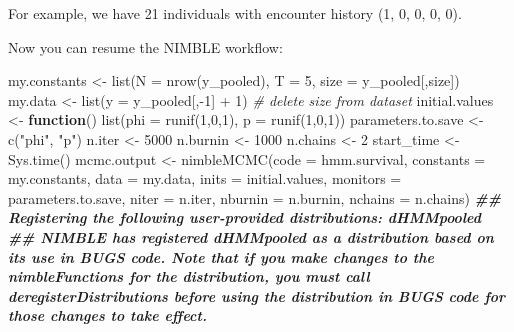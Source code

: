 \documentclass[
  12pt,
]{krantz}
\newenvironment{Shaded}{\begin{snugshade}}{\end{snugshade}}
\newcommand{\AttributeTok}[1]{\textcolor[rgb]{0.77,0.63,0.00}{#1}}
\newcommand{\CommentTok}[1]{\textcolor[rgb]{0.56,0.35,0.01}{\textit{#1}}}
\newcommand{\ControlFlowTok}[1]{\textcolor[rgb]{0.13,0.29,0.53}{\textbf{#1}}}
\newcommand{\DecValTok}[1]{\textcolor[rgb]{0.00,0.00,0.81}{#1}}
\newcommand{\DocumentationTok}[1]{\textcolor[rgb]{0.56,0.35,0.01}{\textbf{\textit{#1}}}}
\newcommand{\FunctionTok}[1]{\textcolor[rgb]{0.00,0.00,0.00}{#1}}
\newcommand{\NormalTok}[1]{#1}
\newcommand{\OtherTok}[1]{\textcolor[rgb]{0.56,0.35,0.01}{#1}}
\newcommand{\SpecialCharTok}[1]{\textcolor[rgb]{0.00,0.00,0.00}{#1}}
\newcommand{\StringTok}[1]{\textcolor[rgb]{0.31,0.60,0.02}{#1}}
\begin{document}
For example, we have 21 individuals with encounter history (1, 0, 0, 0, 0).

Now you can resume the NIMBLE workflow:

\begin{Shaded}
\begin{Highlighting}[]
\NormalTok{my.constants }\OtherTok{\textless{}{-}} \FunctionTok{list}\NormalTok{(}\AttributeTok{N =} \FunctionTok{nrow}\NormalTok{(y\_pooled), }\AttributeTok{T =} \DecValTok{5}\NormalTok{, }\AttributeTok{size =}\NormalTok{ y\_pooled[,}\StringTok{\textquotesingle{}size\textquotesingle{}}\NormalTok{])}
\NormalTok{my.data }\OtherTok{\textless{}{-}} \FunctionTok{list}\NormalTok{(}\AttributeTok{y =}\NormalTok{ y\_pooled[,}\SpecialCharTok{{-}}\DecValTok{1}\NormalTok{] }\SpecialCharTok{+} \DecValTok{1}\NormalTok{) }\CommentTok{\# delete size from dataset}
\NormalTok{initial.values }\OtherTok{\textless{}{-}} \ControlFlowTok{function}\NormalTok{() }\FunctionTok{list}\NormalTok{(}\AttributeTok{phi =} \FunctionTok{runif}\NormalTok{(}\DecValTok{1}\NormalTok{,}\DecValTok{0}\NormalTok{,}\DecValTok{1}\NormalTok{),}
                                  \AttributeTok{p =} \FunctionTok{runif}\NormalTok{(}\DecValTok{1}\NormalTok{,}\DecValTok{0}\NormalTok{,}\DecValTok{1}\NormalTok{))}
\NormalTok{parameters.to.save }\OtherTok{\textless{}{-}} \FunctionTok{c}\NormalTok{(}\StringTok{"phi"}\NormalTok{, }\StringTok{"p"}\NormalTok{)}
\NormalTok{n.iter }\OtherTok{\textless{}{-}} \DecValTok{5000}
\NormalTok{n.burnin }\OtherTok{\textless{}{-}} \DecValTok{1000}
\NormalTok{n.chains }\OtherTok{\textless{}{-}} \DecValTok{2}
\NormalTok{start\_time }\OtherTok{\textless{}{-}} \FunctionTok{Sys.time}\NormalTok{()}
\NormalTok{mcmc.output }\OtherTok{\textless{}{-}} \FunctionTok{nimbleMCMC}\NormalTok{(}\AttributeTok{code =}\NormalTok{ hmm.survival,}
                          \AttributeTok{constants =}\NormalTok{ my.constants,}
                          \AttributeTok{data =}\NormalTok{ my.data,}
                          \AttributeTok{inits =}\NormalTok{ initial.values,}
                          \AttributeTok{monitors =}\NormalTok{ parameters.to.save,}
                          \AttributeTok{niter =}\NormalTok{ n.iter,}
                          \AttributeTok{nburnin =}\NormalTok{ n.burnin,}
                          \AttributeTok{nchains =}\NormalTok{ n.chains)}
\DocumentationTok{\#\# Registering the following user{-}provided distributions: dHMMpooled}
\DocumentationTok{\#\# NIMBLE has registered dHMMpooled as a distribution based on its use in BUGS code. Note that if you make changes to the nimbleFunctions for the distribution, you must call \textquotesingle{}deregisterDistributions\textquotesingle{} before using the distribution in BUGS code for those changes to take effect.}

\end{Highlighting}
\end{Shaded}
\end{document}

